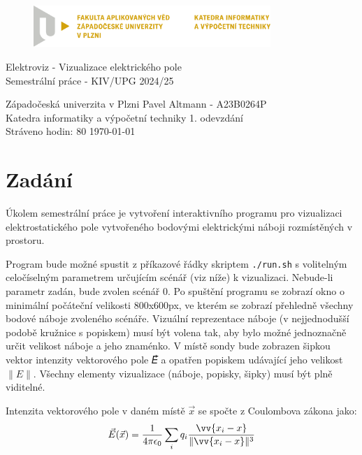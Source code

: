 \documentclass[12pt,a4paper]{paper}
\newcommand{\code}[1]{\texttt{#1}}
\begin{document}
\begin{figure}[H]
	\centering
	\includegraphics[width=0.8\textwidth]{pic/kiv-cmyk-cz}
\end{figure}

\begin{center}
	\vspace{.5cm}
	\LARGE{Elektroviz - Vizualizace elektrického pole}\\
	\large{Semestrální práce - KIV/UPG 2024/25}
\end{center}

\vfill

\noindent
Západočeská univerzita v Plzni \hfill Pavel Altmann - A23B0264P\\
Katedra informatiky a výpočetní techniky \hfill 1. odevzdání\\
Stráveno hodin: 80 \hfill \today
\thispagestyle{empty}

\newpage
\setcounter{page}{1}

\tableofcontents

\newpage

\section{Zadání}

Úkolem semestrální práce je vytvoření interaktivního programu pro vizualizaci
elektrostatického pole vytvořeného bodovými elektrickými náboji rozmístěných v
prostoru.

Program bude možné spustit z příkazové řádky skriptem \code{./run.sh} s
volitelným celočíselným parametrem určujícím scénář (viz níže) k vizualizaci.
Nebude-li parametr zadán, bude zvolen scénář 0. Po spuštění programu se zobrazí
okno o minimální počáteční velikosti 800x600px, ve kterém se zobrazí přehledně
všechny bodové náboje zvoleného scénáře. Vizuální reprezentace náboje (v
nejjednodušší podobě kružnice s popiskem) musí být volena tak, aby bylo možné
jednoznačně určit velikost náboje a jeho znaménko. V místě sondy bude zobrazen
šipkou vektor intenzity vektorového pole 𝐸⃗ a opatřen popiskem udávající jeho
velikost $\|E\|$. Všechny elementy vizualizace (náboje, popisky, šipky) musí být
plně viditelné.

Intenzita vektorového pole v daném místě $\vec{x}$ se spočte
z Coulombova zákona jako:
\[ \vec{E}(\vec{x}) = \frac{1}{4 \pi \epsilon_0}
\sum_i q_i \frac{\vv{x_i - x}}{\|\vv{x_i - x}\|^3} \]
\end{document}
